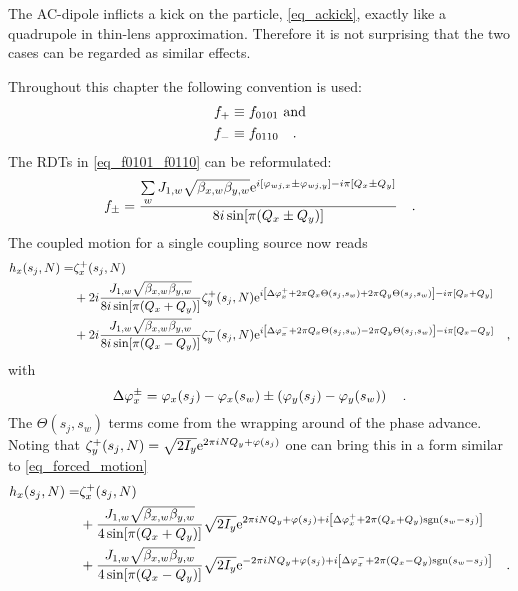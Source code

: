 The AC-dipole inflicts a kick on the particle, \eqref{eq_ackick}, exactly like a quadrupole in thin-lens
approximation. Therefore it is not surprising that the two cases can be regarded as similar effects.

Throughout this chapter the following convention is used:
%
\begin{align}
    f_+ &\equiv f_{0101} \text{ and}\notag \\
    f_- &\equiv f_{0110} 
    \quad .
\end{align}
%
The RDTs in \eqref{eq_f0101_f0110} can be reformulated:
%
\begin{equation}
    f_\pm = 
    \frac{
        \sum\limits_w J_{1,w} \sqrt{\beta_{x,w}\beta_{y,w}}
        \text{e}^{
            i\left[\varphi_{wj,x} \pm \varphi_{wj,y}\right]
            -i\pi\left[Q_x\pm Q_y\right]
        }
    }{
        8i\sin[\pi(Q_x\pm Q_y)]
    }
    \quad .
\end{equation}
%
The coupled motion for a single coupling source now reads
%
\begin{align}
    h_x(s_j,N) =& \zeta_x^+(s_j,N) \notag \\
    &+2i\frac{
         J_{1,w} \sqrt{\beta_{x,w}\beta_{y,w}}
    }{
        8i\sin[\pi(Q_x + Q_y)]
    }
    \zeta_y^+(s_j,N)
        \text{e}^{
            i\left[\Delta\varphi_x^+ + 2\pi Q_x \Theta(s_j,s_w) + 2\pi Q_y \Theta(s_j,s_w)\right]
            -i\pi\left[Q_x + Q_y\right]
        }
        \notag \\
    &+2i\frac{
         J_{1,w} \sqrt{\beta_{x,w}\beta_{y,w}}
    }{
        8i\sin[\pi(Q_x - Q_y)]
    }
    \zeta_y^-(s_j,N)
        \text{e}^{
            i\left[\Delta\varphi_x^- + 2\pi Q_x \Theta(s_j,s_w) - 2\pi Q_y \Theta(s_j,s_w)\right]
            -i\pi\left[Q_x - Q_y\right]
        }
        \quad ,
\end{align}
%
with 
%
\begin{equation}
    \Delta\varphi_x^\pm = \varphi_x(s_j) - \varphi_x(s_w) \pm \left(\varphi_y(s_j) - \varphi_y(s_w)\right)
    \quad .
\end{equation}
%
The $\Theta(s_j,s_w)$ terms come from the wrapping around of the phase advance. Noting that 
$\zeta_y^+(s_j,N) = \sqrt{2I_y}\text{e}^{2\pi i N Q_y + \varphi(s_j)}$
one can bring this in a form similar to \eqref{eq_forced_motion}
%
\begin{align}
    h_x(s_j,N) =& \zeta_x^+(s_j,N) \notag \\
    &+\frac{
         J_{1,w} \sqrt{\beta_{x,w}\beta_{y,w}}
    }{
        4\sin[\pi(Q_x + Q_y)]
    }
    \sqrt{2I_y}
    \text{e}^{
        2\pi i N Q_y + \varphi(s_j)
        +i\left[\Delta\varphi_x^+ + 2\pi (Q_x+Q_y) \text{sgn}(s_w-s_j)\right]
    }
        \notag \\
    &+\frac{
        J_{1,w} \sqrt{\beta_{x,w}\beta_{y,w}}
    }{
        4\sin[\pi(Q_x - Q_y)]
    }
    \sqrt{2I_y}
    \text{e}^{
        -2\pi i N Q_y + \varphi(s_j)
        +i\left[\Delta\varphi_x^- + 2\pi (Q_x-Q_y) \text{sgn}(s_w-s_j)\right]
    }
    \quad .
\end{align}
